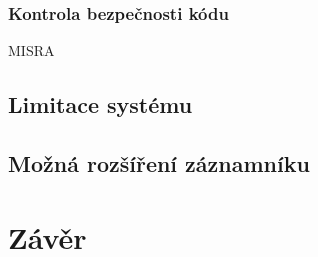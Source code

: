 \subsection{Kontrola bezpečnosti kódu}
MISRA


\section{Limitace systému}
\label{limitace}


\section{Možná rozšíření záznamníku}
\label{mozne_rozsireni}

\chapter{Závěr}
\label{zaverPrace}



%
